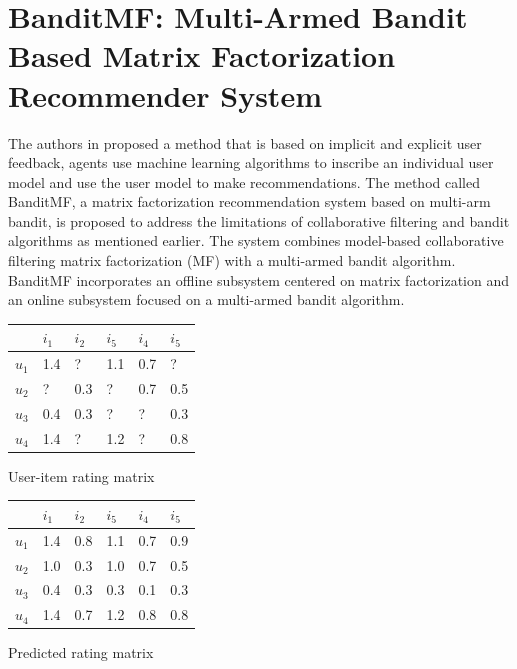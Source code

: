 \section{BanditMF: Multi-Armed Bandit Based Matrix Factorization Recommender System}
The authors in \cite{billsus2000user} proposed a method that is based on implicit and explicit user feedback, agents use machine learning algorithms to inscribe an individual user model and use the user model to make recommendations. The method called BanditMF, a matrix factorization recommendation system based on multi-arm bandit, is proposed to address the limitations of collaborative filtering and bandit algorithms as mentioned earlier. The system combines model-based collaborative filtering matrix factorization (MF) with a multi-armed bandit algorithm. BanditMF incorporates an offline subsystem centered on matrix factorization and an online subsystem focused on a multi-armed bandit algorithm.

\begin{minipage}{\textwidth}
        \begin{minipage}[t]{0.45\textwidth}
            \centering
            \makeatletter{}\makeatother
            \begin{tabular}{llllll}
\hline
                       & $i_{1}$ & $i_{2}$   & $i_{5}$   & $i_{4}$   & $i_{5}$   \\ \hline
\multicolumn{1}{l}{$u_{1}$} & 1.4      & ?   & 1.1 & 0.7 & ?   \\
\multicolumn{1}{l}{$u_{2}$} & ?        & 0.3 & ?   & 0.7 & 0.5 \\
\multicolumn{1}{l}{$u_{3}$} & 0.4      & 0.3 & ?   & ?   & 0.3 \\
$u_{4}$                     & 1.4      & ?   & 1.2 & ?   & 0.8 \\ \hline
\end{tabular}
\caption{User-item rating matrix}
        \end{minipage}
        \begin{minipage}[t]{0.45\textwidth}
        \centering
        \makeatletter{}\makeatother
\begin{tabular}{llllll}
\hline
                       & $i_{1}$ & $i_{2}$   & $i_{5}$   & $i_{4}$   & $i_{5}$   \\ \hline
\multicolumn{1}{l}{$u_{1}$} & 1.4      & 0.8   & 1.1 & 0.7 & 0.9   \\
\multicolumn{1}{l}{$u_{2}$} & 1.0       & 0.3 & 1.0   & 0.7 & 0.5 \\
\multicolumn{1}{l}{$u_{3}$} & 0.4      & 0.3 & 0.3   & 0.1   & 0.3 \\
$u_{4}$                     & 1.4      & 0.7   & 1.2 & 0.8   & 0.8 \\ \hline
\end{tabular}
\caption{Predicted rating matrix}
        \end{minipage}
    \end{minipage}

